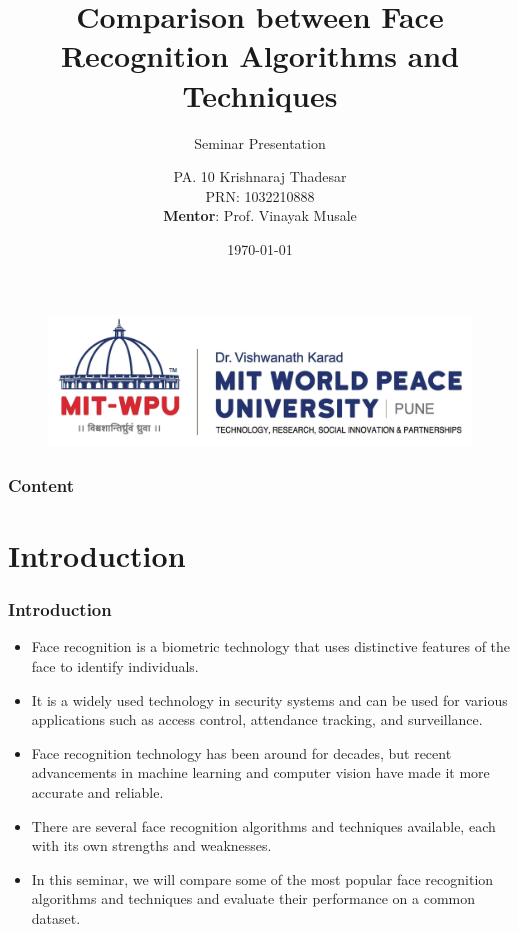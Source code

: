 \documentclass[aspectratio=169]{beamer}
\begin{document}

\title{Comparison between Face Recognition Algorithms and Techniques}
\subtitle{Seminar Presentation}
\author{PA. 10 Krishnaraj Thadesar \\ PRN: 1032210888 \\ \textbf{Mentor}: Prof. Vinayak Musale}

\begin{frame}
	\begin{figure}[H]
		\centering
		\includegraphics[width=.45\textwidth]{mit.jpg}
	\end{figure}
	\titlepage
	\date{\today}

\end{frame}

\begin{frame}
	\frametitle{Content}
	\tableofcontents
\end{frame}

\section{Introduction}
\begin{frame}
	\centering
	\frametitle{Introduction}
	\begin{minipage}{0.95\textwidth}
		\begin{itemize}
			\item Face recognition is a biometric technology that uses distinctive features of the face to identify individuals.
			\item It is a widely used technology in security systems and can be used for various applications such as access control, attendance tracking, and surveillance.
			\item Face recognition technology has been around for decades, but recent advancements in machine learning and computer vision have made it more accurate and reliable.
			\item There are several face recognition algorithms and techniques available, each with its own strengths and weaknesses.
			\item In this seminar, we will compare some of the most popular face recognition algorithms and techniques and evaluate their performance on a common dataset.
		\end{itemize}
	\end{minipage}
\end{frame}
\end{document}
